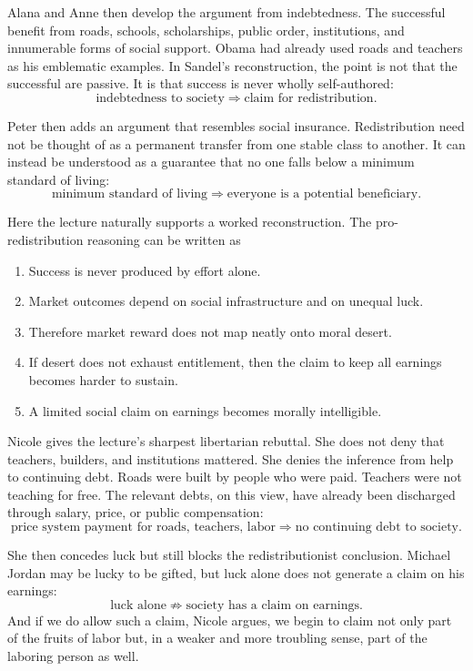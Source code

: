 Alana and Anne then develop the argument from indebtedness. The successful benefit from roads, schools, scholarships, public order, institutions, and innumerable forms of social support. Obama had already used roads and teachers as his emblematic examples. In Sandel's reconstruction, the point is not that the successful are passive. It is that success is never wholly self-authored:
\begin{equation}
\text{indebtedness to society}
\Longrightarrow
\text{claim for redistribution}.
\end{equation}

Peter then adds an argument that resembles social insurance. Redistribution need not be thought of as a permanent transfer from one stable class to another. It can instead be understood as a guarantee that no one falls below a minimum standard of living:
\begin{equation}
\text{minimum standard of living}
\Longrightarrow
\text{everyone is a potential beneficiary}.
\end{equation}

Here the lecture naturally supports a worked reconstruction. The pro-redistribution reasoning can be written as
\begin{enumerate}
\item Success is never produced by effort alone.
\item Market outcomes depend on social infrastructure and on unequal luck.
\item Therefore market reward does not map neatly onto moral desert.
\item If desert does not exhaust entitlement, then the claim to keep all earnings becomes harder to sustain.
\item A limited social claim on earnings becomes morally intelligible.
\end{enumerate}

Nicole gives the lecture's sharpest libertarian rebuttal. She does not deny that teachers, builders, and institutions mattered. She denies the inference from help to continuing debt. Roads were built by people who were paid. Teachers were not teaching for free. The relevant debts, on this view, have already been discharged through salary, price, or public compensation:
\begin{equation}
\text{price system payment for roads, teachers, labor}
\Longrightarrow
\text{no continuing debt to society}.
\end{equation}

She then concedes luck but still blocks the redistributionist conclusion. Michael Jordan may be lucky to be gifted, but luck alone does not generate a claim on his earnings:
\begin{equation}
\text{luck alone}
\not\Longrightarrow
\text{society has a claim on earnings}.
\end{equation}
And if we do allow such a claim, Nicole argues, we begin to claim not only part of the fruits of labor but, in a weaker and more troubling sense, part of the laboring person as well.

